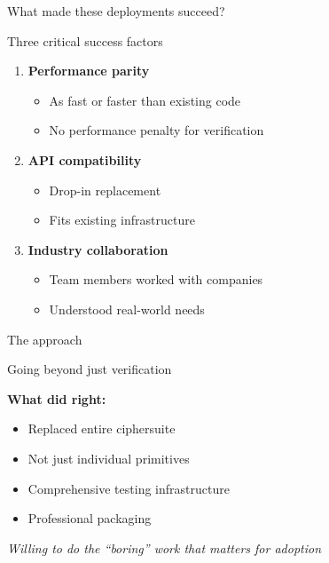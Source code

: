 \documentclass[aspectratio=169, lualatex, handout]{beamer}
\begin{document}
\begin{frame}{What made these deployments succeed?}
	\begin{center}
		\Large
		Three critical success factors
	\end{center}
	\vspace{1em}
	\begin{enumerate}
		\item \textbf{Performance parity}
		      \begin{itemize}
			      \item As fast or faster than existing code
			      \item No performance penalty for verification
		      \end{itemize}
		      \vspace{0.5em}
		\item \textbf{API compatibility}
		      \begin{itemize}
			      \item Drop-in replacement
			      \item Fits existing infrastructure
		      \end{itemize}
		      \vspace{0.5em}
		\item \textbf{Industry collaboration}
		      \begin{itemize}
			      \item Team members worked with companies
			      \item Understood real-world needs
		      \end{itemize}
	\end{enumerate}
\end{frame}

\begin{frame}{The \haclstar approach}
	\begin{center}
		\Large
		Going beyond just verification
	\end{center}
	\vspace{1em}
	\textbf{What \haclstar did right:}
	\begin{itemize}
		\item Replaced entire ciphersuite
		\item Not just individual primitives
		\item Comprehensive testing infrastructure
		\item Professional packaging
	\end{itemize}
	\vspace{1em}
	\begin{center}
		\textit{Willing to do the ``boring'' work that matters for adoption}
	\end{center}
\end{frame}
\end{document}
